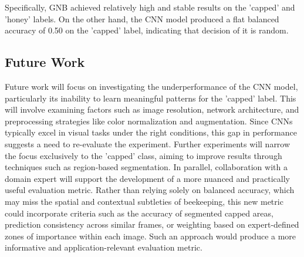 \documentclass{llncs}
\begin{document}
Specifically, GNB achieved relatively high and stable results on the 'capped' and 'honey' labels. On the other hand, the CNN model produced a flat balanced accuracy of 0.50 on the 'capped' label, indicating that decision of it is random.

\subsection*{Future Work}

Future work will focus on investigating the underperformance of the CNN model, particularly its inability to learn meaningful patterns for the 'capped' label. This will involve examining factors such as image resolution, network architecture, and preprocessing strategies like color normalization and augmentation. Since CNNs typically excel in visual tasks under the right conditions, this gap in performance suggests a need to re-evaluate the experiment. Further experiments will narrow the focus exclusively to the 'capped' class, aiming to improve results through techniques such as region-based segmentation. In parallel, collaboration with a domain expert will support the development of a more nuanced and practically useful evaluation metric. Rather than relying solely on balanced accuracy, which may miss the spatial and contextual subtleties of beekeeping, this new metric could incorporate criteria such as the accuracy of segmented capped areas, prediction consistency across similar frames, or weighting based on expert-defined zones of importance within each image. Such an approach would produce a more informative and application-relevant evaluation metric.

\vspace{1em}





\end{document}
